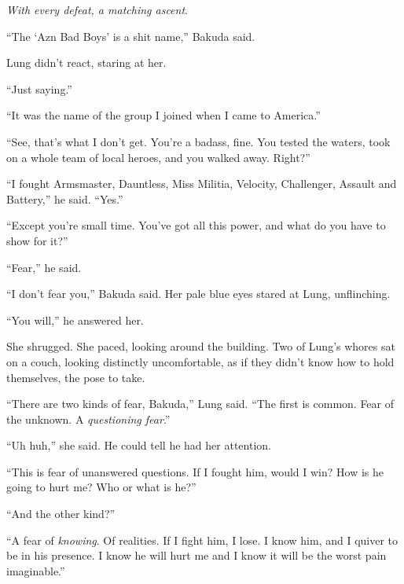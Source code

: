 \emph{With every defeat, a matching ascent}.



``The `Azn Bad Boys' is a shit name,'' Bakuda said.



Lung didn't react, staring at her.



``Just saying.''



``It was the name of the group I joined when I came to America.''



``See, that's what I don't get.  You're a badass, fine.  You tested the waters, took on a whole team of local heroes, and you walked away.  Right?''



``I fought Armsmaster, Dauntless, Miss Militia, Velocity, Challenger, Assault and Battery,'' he said.  ``Yes.''



``Except you're small time.  You've got all this power, and what do you have to show for it?''



``Fear,'' he said.



``I don't fear you,'' Bakuda said.  Her pale blue eyes stared at Lung, unflinching.



``You will,'' he answered her.



She shrugged.  She paced, looking around the building.  Two of Lung's whores sat on a couch, looking distinctly uncomfortable, as if they didn't know how to hold themselves, the pose to take.



``There are two kinds of fear, Bakuda,'' Lung said.  ``The first is common.  Fear of the unknown.  A \emph{questioning fear}.''



``Uh huh,'' she said.  He could tell he had her attention.



``This is fear of unanswered questions.  If I fought him, would I win?  How is he going to hurt me?  Who or what is he?''



``And the other kind?''



``A fear of \emph{knowing}.  Of realities.  If I fight him, I lose.  I know him, and I quiver to be in his presence.  I know he will hurt me and I know it will be the worst pain imaginable.''



